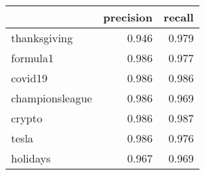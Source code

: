 \begin{tabular}{lrr}
\toprule
{} &  precision &  recall \\
\midrule
thanksgiving    &      0.946 &   0.979 \\
formula1        &      0.986 &   0.977 \\
covid19         &      0.986 &   0.986 \\
championsleague &      0.986 &   0.969 \\
crypto          &      0.986 &   0.987 \\
tesla           &      0.986 &   0.976 \\
holidays        &      0.967 &   0.969 \\
\bottomrule
\end{tabular}
